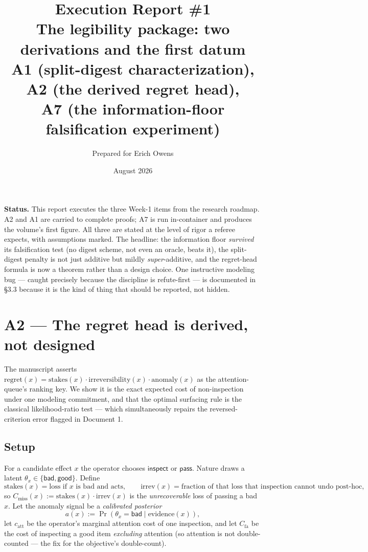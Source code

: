 \documentclass[11pt,a4paper]{article}
\title{\textbf{Execution Report \#1}\\[4pt]
\large The legibility package: two derivations and the first datum\\[3pt]
\normalsize A1 (split-digest characterization), A2 (the derived regret head),\\ A7 (the information-floor falsification experiment)}
\author{Prepared for Erich Owens}
\date{August 2026}
\begin{document}
\maketitle

\noindent\textbf{Status.} This report executes the three Week-1 items from the research roadmap. A2 and A1 are carried to complete proofs; A7 is run in-container and produces the volume's first figure. All three are stated at the level of rigor a referee expects, with assumptions marked. The headline: the information floor \emph{survived} its falsification test (no digest scheme, not even an oracle, beats it), the split-digest penalty is not just additive but mildly \emph{super}-additive, and the regret-head formula is now a theorem rather than a design choice. One instructive modeling bug --- caught precisely because the discipline is refute-first --- is documented in \S3.3 because it is the kind of thing that should be reported, not hidden.

\section{A2 --- The regret head is derived, not designed}
The manuscript asserts $\mathrm{regret}(x) = \mathrm{stakes}(x)\cdot\mathrm{irreversibility}(x)\cdot\mathrm{anomaly}(x)$ as the attention-queue's ranking key. We show it is the exact expected cost of non-inspection under one modeling commitment, and that the optimal surfacing rule is the classical likelihood-ratio test --- which simultaneously repairs the reversed-criterion error flagged in Document 1.

\subsection{Setup}
For a candidate effect $x$ the operator chooses $\mathsf{inspect}$ or $\mathsf{pass}$. Nature draws a latent $\theta_x\in\{\mathsf{bad},\mathsf{good}\}$. Define
\[
\text{stakes}(x) = \text{loss if } x \text{ is bad and acts}, \qquad
\text{irrev}(x) = \text{fraction of that loss that inspection cannot undo post-hoc},
\]
so $C_\text{miss}(x) := \text{stakes}(x)\cdot\text{irrev}(x)$ is the \emph{unrecoverable} loss of passing a bad $x$. Let the anomaly signal be a \emph{calibrated posterior}
\[
a(x) := \Pr(\theta_x = \mathsf{bad} \mid \text{evidence}(x)),
\]
let $c_\text{att}$ be the operator's marginal attention cost of one inspection, and let $C_\text{fa}$ be the cost of inspecting a good item \emph{excluding} attention (so attention is not double-counted --- the fix for the objective's double-count).
\end{document}
